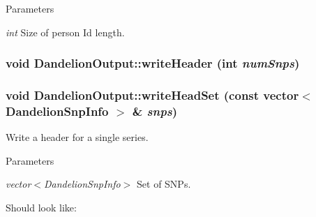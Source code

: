\begin{DoxyParams}{Parameters}
\item[{\em int}]Size of person Id length. \end{DoxyParams}
\hypertarget{classDandelionOutput_acff40c7e6f90361aa9a96195039f6016}{
\subsubsection[{writeHeader}]{\setlength{\rightskip}{0pt plus 5cm}void DandelionOutput::writeHeader (int {\em numSnps})}}
\label{classDandelionOutput_acff40c7e6f90361aa9a96195039f6016}
\hypertarget{classDandelionOutput_a3b4644ac035b093a86e6cf9e45bd2fc3}{
\subsubsection[{writeHeadSet}]{\setlength{\rightskip}{0pt plus 5cm}void DandelionOutput::writeHeadSet (const vector$<$ {\bf DandelionSnpInfo} $>$ \& {\em snps})}}
\label{classDandelionOutput_a3b4644ac035b093a86e6cf9e45bd2fc3}
Write a header for a single series.


\begin{DoxyParams}{Parameters}
\item[{\em vector$<$DandelionSnpInfo$>$}]Set of SNPs.\end{DoxyParams}
Should look like:

